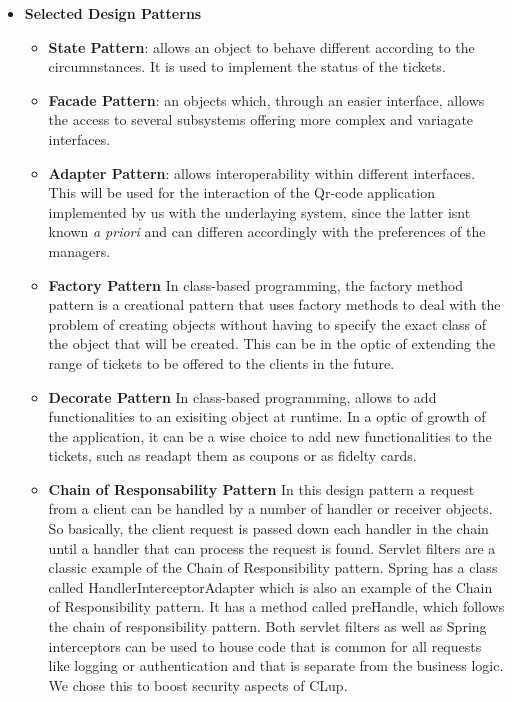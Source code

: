 \begin{itemize}[topsep=0pt]
    \item \textbf{Selected Design Patterns}
        \begin{itemize}[topsep=0pt]
            \item \textbf{State Pattern}: allows an object to behave different according to the circumnstances. It is used to implement the status of the tickets.
            \item \textbf{Facade Pattern}: an objects which, through an easier interface, allows the access to several subsystems offering more complex and variagate interfaces.
            \item \textbf{Adapter Pattern}: allows interoperability within different interfaces. This will be used for the interaction of the Qr-code application implemented by us with the underlaying system, since the latter isnt known \textit{a priori} and can differen accordingly with the preferences of the managers.
            \item \textbf{Factory Pattern} In class-based programming, the factory method pattern is a creational pattern that uses factory methods to deal with the problem of creating objects without having to specify the exact class of the object that will be created. This can be in the optic of extending the range of tickets to be offered to the clients in the future.
            \item \textbf{Decorate Pattern} In class-based programming, allows to add functionalities to an exisiting object at runtime.
            In a optic of growth of the application, it can be a wise choice to add new functionalities to the tickets, such as readapt them as coupons or as fidelty cards.
            \item \textbf{Chain of Responsability Pattern}  In this design pattern a request from a client can be handled by a number of handler or receiver objects. So basically, the client request is passed down each handler in the chain until a handler that can process the request is found. Servlet filters are a classic example of the Chain of Responsibility pattern. Spring has a class called HandlerInterceptorAdapter which is also an example of the Chain of Responsibility pattern. It has a method called preHandle, which follows the chain of responsibility pattern. Both servlet filters as well as Spring interceptors can be used to house code that is common for all requests like logging or authentication and that is separate from the business logic. We chose this to boost security aspects of CLup.

\end{itemize}
\end{itemize}
